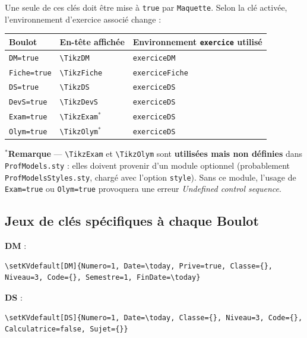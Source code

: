 \documentclass[11pt,a4paper]{article}
\newcommand{\cmdname}[1]{\texttt{\textbackslash#1}}
\begin{document}
Une seule de ces clés doit être mise à \texttt{true} par \texttt{Maquette}. Selon la clé activée, l'environnement d'exercice associé change :

\begin{center}
\begin{tabular}{@{}lll@{}}
\toprule
\textbf{Boulot} & \textbf{En-tête affichée} & \textbf{Environnement \texttt{exercice} utilisé} \\
\midrule
\texttt{DM=true}   & \cmdname{TikzDM}   & \texttt{exerciceDM} \\
\texttt{Fiche=true} & \cmdname{TikzFiche} & \texttt{exerciceFiche} \\
\texttt{DS=true}   & \cmdname{TikzDS}   & \texttt{exerciceDS} \\
\texttt{DevS=true} & \cmdname{TikzDevS} & \texttt{exerciceDS} \\
\texttt{Exam=true} & \cmdname{TikzExam}$^{*}$ & \texttt{exerciceDS} \\
\texttt{Olym=true} & \cmdname{TikzOlym}$^{*}$ & \texttt{exerciceDS} \\
\bottomrule
\end{tabular}
\end{center}

\begin{avertissement}
\textbf{$^{*}$Remarque} — \cmdname{TikzExam} et \cmdname{TikzOlym} sont \textbf{utilisées mais non définies} dans \texttt{ProfModels.sty} : elles doivent provenir d'un module optionnel (probablement \texttt{ProfModelsStyles.sty}, chargé avec l'option \texttt{style}). Sans ce module, l'usage de \texttt{Exam=true} ou \texttt{Olym=true} provoquera une erreur \textit{Undefined control sequence}.
\end{avertissement}

\subsection{Jeux de clés spécifiques à chaque Boulot}
\label{sec:cles-boulot}

\textbf{DM} :
\begin{lstlisting}
\setKVdefault[DM]{Numero=1, Date=\today, Prive=true, Classe={}, Niveau=3, Code={}, Semestre=1, FinDate=\today}
\end{lstlisting}

\textbf{DS} :
\begin{lstlisting}
\setKVdefault[DS]{Numero=1, Date=\today, Classe={}, Niveau=3, Code={}, Calculatrice=false, Sujet={}}
\end{lstlisting}
\end{document}
